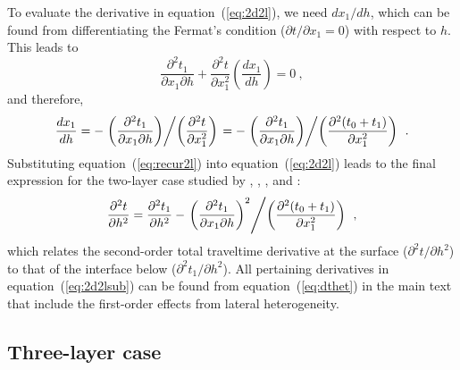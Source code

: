 To evaluate the derivative in equation~(\ref{eq:2d2l}), we need $d x_1/d h$, which can be found from differentiating the Fermat's condition ($\partial t/ \partial x_1 = 0$) with respect to $h$. This leads to
\begin{equation}
 \frac{\partial^2 t_1 }{ \partial x_1 \partial h} + \frac{\partial^2 t }{ \partial x_1^2} \left( \frac{d x_1}{d h}\right) = 0~,
\end{equation} 
and therefore,
\begin{equation}
\label{eq:recur2l}
 \frac{d x_1}{d h} = - \left. \left(\frac{\partial^2 t_1 }{ \partial x_1 \partial h}\right) \middle/ \left(\frac{\partial^2 t }{ \partial x_1^2} \right) \right. =  - \left. \left(\frac{\partial^2 t_1 }{ \partial x_1 \partial h}\right) \middle/ \left(\frac{\partial^2 (t_0+t_1) }{ \partial x_1^2} \right) \right.  ~.
\end{equation} 
Substituting equation~(\ref{eq:recur2l}) into equation~(\ref{eq:2d2l}) leads to the final expression for the two-layer case studied by \cite{blias1981}, \cite{bliasgrit1984}, \cite{gritsenko}, and \cite{goldin}:
\begin{equation}
\label{eq:2d2lsub}
\frac{\partial^2 t}{\partial h^2} = \frac{\partial^2 t_1}{\partial h^2} - \left. \left(\frac{\partial^2 t_1 }{ \partial x_1 \partial h}\right)^2 \middle/ \left(\frac{\partial^2 (t_0+t_1) }{ \partial x_1^2} \right) \right. ~,
\end{equation}
which relates the second-order total traveltime derivative at the surface ($\partial^2 t/\partial h^2$) to that of the interface below ($\partial^2 t_1/\partial h^2$). All pertaining derivatives in equation~(\ref{eq:2d2lsub}) can be found from equation~(\ref{eq:dthet}) in the main text that include the first-order effects from lateral heterogeneity. 

\subsection{Three-layer case}

